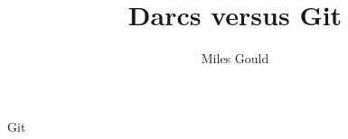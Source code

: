 \documentclass[pdf]{prosper}
\title{Darcs versus Git}
\author{Miles Gould}
\begin{document}
\maketitle
\begin{slide}{Git}
\end{slide}
\end{document}
